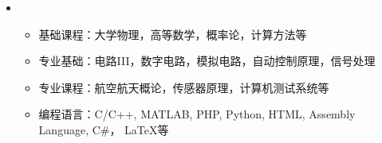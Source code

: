 \reslheading{{\color{white}{ 教育经历}} }
  \begin{itemize}[leftmargin=*]
    \item
      {\small
     
     
      \begin{itemize}
        \item{基础课程：大学物理，高等数学，概率论，计算方法等}
      \end{itemize} 
       \begin{itemize}
        \item{专业基础：电路III，数字电路，模拟电路，自动控制原理，信号处理}
      \end{itemize}
      

       \begin{itemize}
        \item{专业课程：航空航天概论，传感器原理，计算机测试系统等}
      \end{itemize}
     
      
       \begin{itemize}
        \item{编程语言：C/C++, MATLAB, PHP, Python, HTML, Assembly  Language, C\#， \LaTeX 等}
      \end{itemize}
            }
            

  \end{itemize}
